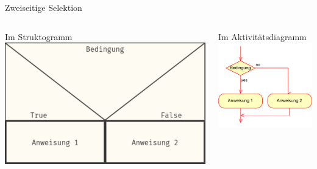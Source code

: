 \documentclass[xelatex,aspectratio=169]{beamer}
\begin{document}
\begin{frame}{Zweiseitige Selektion}

  \begin{columns}[t]
    \begin{column}{.4\linewidth}
      \begin{block}{Im Struktogramm}
        \centering
        \includegraphics[width=\textwidth]{fig/algorithmus_zweiseitige_selektion_struktogram.pdf}
      \end{block}
    \end{column}
    \begin{column}{.3\linewidth}
      \begin{block}{Im Aktivitätsdiagramm}
        \centering
        \includegraphics[width=\textwidth]{fig/algorithmus_zweiseitige_selektion_aktivitaetsdiagram.drawio.pdf}
      \end{block}


\end{column}
\end{columns}
\end{frame}
\end{document}
